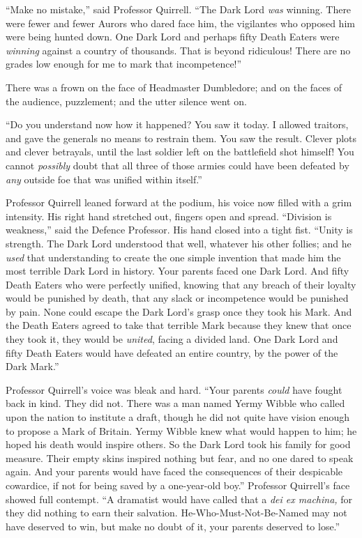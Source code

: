 ``Make no mistake,'' said Professor Quirrell. ``The Dark Lord \emph{was}
winning. There were fewer and fewer Aurors who dared face him, the
vigilantes who opposed him were being hunted down. One Dark Lord and
perhaps fifty Death Eaters were \emph{winning} against a country of
thousands. That is beyond ridiculous! There are no grades low enough for
me to mark that incompetence!''

There was a frown on the face of Headmaster Dumbledore; and on the faces
of the audience, puzzlement; and the utter silence went on.

``Do you understand now how it happened? You saw it today. I allowed
traitors, and gave the generals no means to restrain them. You saw the
result. Clever plots and clever betrayals, until the last soldier left
on the battlefield shot himself! You cannot \emph{possibly} doubt that
all three of those armies could have been defeated by \emph{any} outside
foe that was unified within itself.''

Professor Quirrell leaned forward at the podium, his voice now filled
with a grim intensity. His right hand stretched out, fingers open and
spread. ``Division is weakness,'' said the Defence Professor. His hand
closed into a tight fist. ``Unity is strength. The Dark Lord understood
that well, whatever his other follies; and he \emph{used} that
understanding to create the one simple invention that made him the most
terrible Dark Lord in history. Your parents faced one Dark Lord. And
fifty Death Eaters who were perfectly unified, knowing that any breach
of their loyalty would be punished by death, that any slack or
incompetence would be punished by pain. None could escape the Dark
Lord's grasp once they took his Mark. And the Death Eaters agreed to
take that terrible Mark because they knew that once they took it, they
would be \emph{united}, facing a divided land. One Dark Lord and fifty
Death Eaters would have defeated an entire country, by the power of the
Dark Mark.''

Professor Quirrell's voice was bleak and hard. ``Your parents
\emph{could} have fought back in kind. They did not. There was a man
named Yermy Wibble who called upon the nation to institute a draft,
though he did not quite have vision enough to propose a Mark of Britain.
Yermy Wibble knew what would happen to him; he hoped his death would
inspire others. So the Dark Lord took his family for good measure. Their
empty skins inspired nothing but fear, and no one dared to speak again.
And your parents would have faced the consequences of their despicable
cowardice, if not for being saved by a one-year-old boy.'' Professor
Quirrell's face showed full contempt. ``A dramatist would have called
that a \emph{dei ex machina,} for they did nothing to earn their
salvation. He-Who-Must-Not-Be-Named may not have deserved to win, but
make no doubt of it, your parents deserved to lose.''

